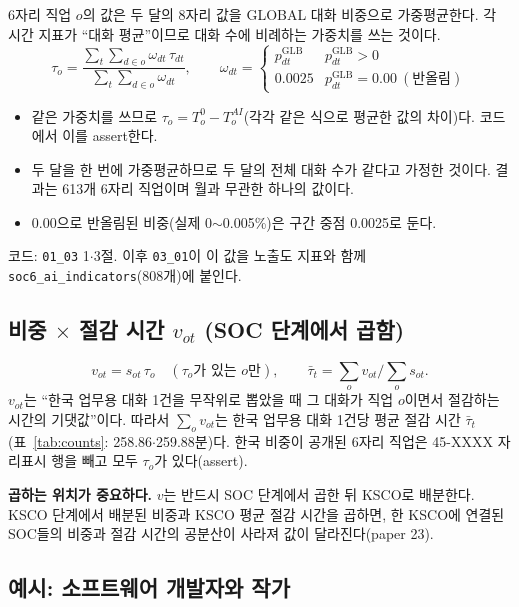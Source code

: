 \documentclass[11pt]{article}
\begin{document}
6자리 직업 $o$의 값은 두 달의 8자리 값을 GLOBAL 대화 비중으로 가중평균한다. 각 시간 지표가 ``대화 평균''이므로 대화 수에 비례하는 가중치를 쓰는 것이다.
\begin{equation}
\tau_o = \frac{\sum_{t} \sum_{d \in o} \omega_{dt}\, \tau_{dt}}{\sum_{t} \sum_{d \in o} \omega_{dt}}, \qquad
\omega_{dt} = \begin{cases} p^{\text{GLB}}_{dt} & p^{\text{GLB}}_{dt} > 0 \\ 0.0025 & p^{\text{GLB}}_{dt} = 0.00\ (\text{반올림}) \end{cases}
\label{eq:tauo}
\end{equation}
\begin{itemize}[leftmargin=*]
  \item 같은 가중치를 쓰므로 $\tau_o = T^{0}_o - T^{AI}_o$(각각 같은 식으로 평균한 값의 차이)다. 코드에서 이를 assert한다.
  \item 두 달을 한 번에 가중평균하므로 두 달의 전체 대화 수가 같다고 가정한 것이다. 결과는 613개 6자리 직업이며 월과 무관한 하나의 값이다.
  \item 0.00으로 반올림된 비중(실제 0$\sim$0.005\%)은 구간 중점 0.0025로 둔다.
\end{itemize}
코드: \texttt{01\_03} 1$\cdot$3절. 이후 \texttt{03\_01}이 이 값을 노출도 지표와 함께 \texttt{soc6\_ai\_indicators}(808개)에 붙인다.

\subsection{비중 $\times$ 절감 시간 $v_{ot}$ (SOC 단계에서 곱함)}

\begin{equation}
v_{ot} = s_{ot}\, \tau_o \quad (\tau_o\text{가 있는 } o\text{만}), \qquad
\bar\tau_t = \sum_o v_{ot} \Big/ \sum_o s_{ot}.
\label{eq:v}
\end{equation}
$v_{ot}$는 ``한국 업무용 대화 1건을 무작위로 뽑았을 때 그 대화가 직업 $o$이면서 절감하는 시간의 기댓값''이다. 따라서 $\sum_o v_{ot}$는 한국 업무용 대화 1건당 평균 절감 시간 $\bar\tau_t$(표~\ref{tab:counts}: 258.86$\cdot$259.88분)다. 한국 비중이 공개된 6자리 직업은 45-XXXX 자리표시 행을 빼고 모두 $\tau_o$가 있다(assert).

\textbf{곱하는 위치가 중요하다.} $v$는 반드시 SOC 단계에서 곱한 뒤 KSCO로 배분한다. KSCO 단계에서 배분된 비중과 KSCO 평균 절감 시간을 곱하면, 한 KSCO에 연결된 SOC들의 비중과 절감 시간의 공분산이 사라져 값이 달라진다(paper 23).

\subsection{예시: 소프트웨어 개발자와 작가}
\end{document}
